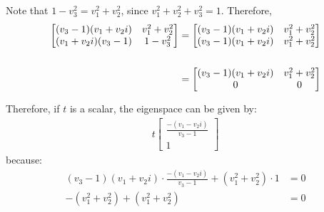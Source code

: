 Note that $1 - v_3^2 = v_1^2 + v_2^2$,
since $v_1^2 + v_2^2 + v_3^2 = 1$. Therefore,
%
\begin{align}
    \left[ \begin{matrix}
            (v_3 - 1)(v_1 + v_2i) & v_1^2 + v_2^2 \\
            (v_1 + v_2i)(v_3 - 1) & 1 -v_3^2
        \end{matrix} \right]
        &=
        \left[ \begin{matrix}
            (v_3 - 1)(v_1 + v_2i) & v_1^2 + v_2^2 \\
            (v_3 - 1)(v_1 + v_2i) & v_1^2 + v_2^2
        \end{matrix} \right] \\ \notag \\
    &= \left[ \begin{matrix}
            (v_3 - 1)(v_1 + v_2i) & v_1^2 + v_2^2 \\
            0 & 0
        \end{matrix} \right]
\end{align}

Therefore, if $t$ is a scalar,
the eigenspace can be given by:
\begin{align}
    t \left[ \begin{matrix}
        \frac{-(v_1 - v_2i)}{v_3 - 1} \\ 1
    \end{matrix} \right]
\end{align}
because:
\begin{align}
    (v_3 - 1)(v_1 + v_2i) \cdot
    \frac{-(v_1 - v_2i)}{v_3 - 1} +
    (v_1^2 + v_2^2) \cdot 1 &= 0 \\
    -(v_1^2 + v_2^2) + (v_1^2 + v_2^2) &= 0
\end{align}

